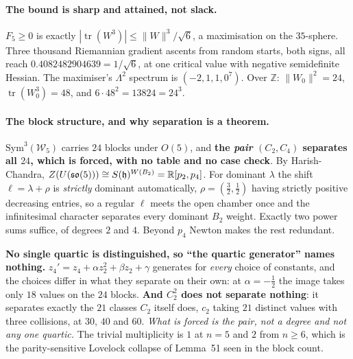 \paragraph{The bound is sharp and attained, not slack.} $F_5\ge0$ is exactly $|\operatorname{tr}(W^3)|\le\|W\|^3/\sqrt6$, a maximisation on the $35$-sphere. Three thousand Riemannian gradient ascents from random starts, both signs, all reach $0.4082482904639=1/\sqrt6$, at one critical value with negative semidefinite Hessian. The maximiser's $\Lambda^2$ spectrum is $(-2,1,1,0^7)$. Over $\mathbb Z$: $\|W_0\|^2=24$, $\operatorname{tr}(W_0^3)=48$, and $6\cdot48^2=13824=24^3$.

\paragraph{The block structure, and why separation is a theorem.} $\mathrm{Sym}^3(\mathcal W_5)$ carries $24$ blocks under $O(5)$, and \textbf{the \emph{pair} $(C_2,C_4)$ separates all $24$, which is forced, with no table and no case check}. By Harish-Chandra, $Z(U(\mathfrak{so}(5)))\cong S(\mathfrak{h})^{W(B_2)}=\mathbb{R}[p_2,p_4]$. For dominant $\lambda$ the shift $\ell=\lambda+\rho$ is \emph{strictly} dominant automatically, $\rho=(\tfrac32,\tfrac12)$ having strictly positive decreasing entries, so a regular $\ell$ meets the open chamber once and the infinitesimal character separates every dominant $B_2$ weight. Exactly two power sums suffice, of degrees $2$ and $4$. Beyond $p_4$ Newton makes the rest redundant.

\textbf{No single quartic is distinguished, so ``the quartic generator'' names nothing.} $z_4'=z_4+\alpha z_2^2+\beta z_2+\gamma$ generates for \emph{every} choice of constants, and the choices differ in what they separate on their own: at $\alpha=-\tfrac12$ the image takes only $18$ values on the $24$ blocks. \textbf{And $C_2^2$ does not separate nothing}: it separates exactly the $21$ classes $C_2$ itself does, $c_2$ taking $21$ distinct values with three collisions, at $30$, $40$ and $60$. \emph{What is forced is the pair, not a degree and not any one quartic.} The trivial multiplicity is $1$ at $n=5$ and $2$ from $n\ge6$, which is the parity-sensitive Lovelock collapse of Lemma~51 seen in the block count.

